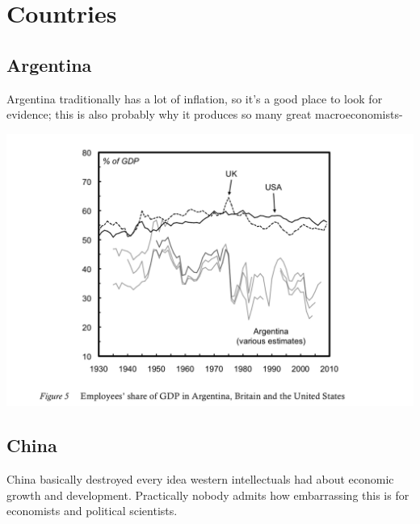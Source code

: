 \documentclass[
]{book}
\begin{document}
\hypertarget{countries}{%
\chapter{Countries}\label{countries}}

\hypertarget{argentina}{%
\section{Argentina}\label{argentina}}

Argentina traditionally has a lot of inflation,
so it's a good place to look for evidence;
this is also probably why it produces so many great macroeconomists-

\includegraphics{fig/argentina_labour_share.png}

\hypertarget{china-1}{%
\section{China}\label{china-1}}

China basically destroyed every idea western intellectuals had about economic growth and development.
Practically nobody admits how embarrassing this is for economists and political scientists.
\end{document}
